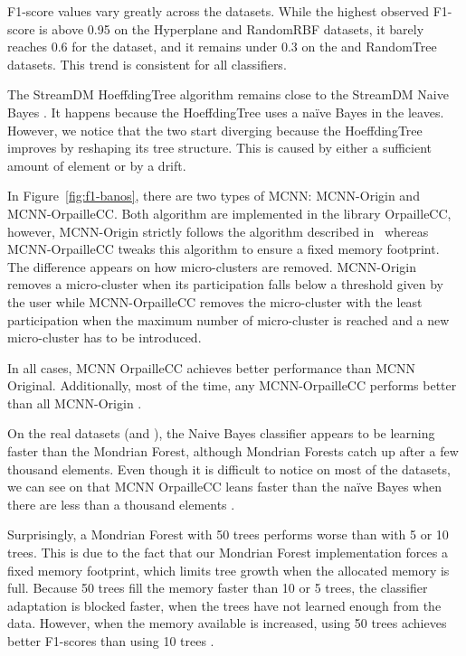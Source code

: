 F1-score values vary greatly across the datasets.  While the highest
observed F1-score is above 0.95 on the Hyperplane and RandomRBF datasets,
it barely reaches 0.6 for the \banosdataset dataset, and it remains under
0.3 on the \recofitdataset and RandomTree datasets. This trend is
consistent for all classifiers.

The StreamDM HoeffdingTree algorithm remains close to the StreamDM Naive Bayes .
It happens because the HoeffdingTree
uses a naïve Bayes in the leaves. However, we notice that the two start
diverging because the HoeffdingTree improves by reshaping its tree structure.
This is caused by either a sufficient amount of element or by a drift.

In Figure~\ref{fig:f1-banos}, there are two types of MCNN: MCNN-Origin and
MCNN-OrpailleCC.  Both algorithm are implemented in the library OrpailleCC,
however, MCNN-Origin strictly follows the algorithm described in~\cite{mc-nn}
whereas MCNN-OrpailleCC tweaks this algorithm to ensure a fixed memory
footprint. The difference appears on how micro-clusters are removed.
MCNN-Origin removes a micro-cluster when its participation falls below a
threshold given by the user while MCNN-OrpailleCC removes the micro-cluster with
the least participation when the maximum number of micro-cluster is reached and
a new micro-cluster has to be introduced. 

In all cases, MCNN OrpailleCC achieves
better performance than MCNN Original. Additionally, most of
the time, any MCNN-OrpailleCC performs better than all MCNN-Origin .

On the real datasets (\banosdataset and \recofitdataset), the
Naive Bayes classifier appears to be learning faster than the Mondrian Forest, although Mondrian Forests catch up
after a few thousand elements. Even though it is difficult to notice on most of
the datasets, we can see on \banosdataset that MCNN OrpailleCC leans faster
than the naïve Bayes when there are less than a thousand elements .

Surprisingly, a Mondrian Forest with 50 trees performs worse than with
5 or 10 trees. This is due to the fact that our
Mondrian Forest implementation forces a fixed memory footprint, which limits tree growth
when the allocated memory is full. Because 50 trees fill the
memory faster than 10 or 5 trees, the classifier adaptation is blocked faster,
when the trees have not learned enough from the data. However, when the memory
available is increased, using 50 trees achieves better F1-scores than using 10
trees .

